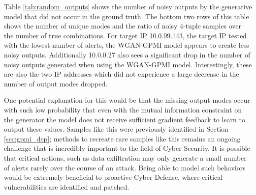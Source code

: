 Table \ref{tab:random_outputs} shows the number of noisy outputs by the generative model that did not occur in the ground truth. The bottom two rows of this table shows the number of unique modes and the ratio of noisy 4-tuple samples over the number of true combinations.  For target IP 10.0.99.143, the target IP tested with the lowest number of alerts, the WGAN-GPMI model appears to create less noisy outputs. Additionally 10.0.0.27 also sees a significant drop in the number of noisy outputs generated when using the WGAN-GPMI model. Interestingly, these are also the two IP addresses which did not experience a large decrease in the number of output modes dropped. 

One potential explanation for this would be that the missing output modes occur with such low probability that even with the mutual information constraint on the generator the model does not receive sufficient gradient feedback to learn to output these values. Samples like this were previously identified in Section \ref{sec:gpmi_dep}; methods to recreate rare samples like this remains an ongoing challenge that is incredibly important to the field of Cyber Security. It is possible that critical actions, such as data exfiltration may only generate a small number of alerts rarely over the course of an attack. Being able to model such behaviors would be extremely beneficial to proactive Cyber Defense, where critical vulnerabilities are identified and patched. 

